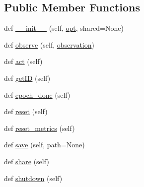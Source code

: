 \subsection*{Public Member Functions}
\begin{DoxyCompactItemize}
\item 
def \hyperlink{classparlai_1_1agents_1_1legacy__agents_1_1seq2seq_1_1seq2seq__v0_1_1Agent_ae84057ceae2e7cf0b5d6248b48596b76}{\+\_\+\+\_\+init\+\_\+\+\_\+} (self, \hyperlink{classparlai_1_1agents_1_1legacy__agents_1_1seq2seq_1_1seq2seq__v0_1_1Agent_ae07383697f7232bb21cbd0a1c6e93389}{opt}, shared=None)
\item 
def \hyperlink{classparlai_1_1agents_1_1legacy__agents_1_1seq2seq_1_1seq2seq__v0_1_1Agent_a39f030b5540055279a41d99dd8b8690c}{observe} (self, \hyperlink{classparlai_1_1agents_1_1legacy__agents_1_1seq2seq_1_1seq2seq__v0_1_1Agent_a6371fe160ef331078a794fc1d8b67371}{observation})
\item 
def \hyperlink{classparlai_1_1agents_1_1legacy__agents_1_1seq2seq_1_1seq2seq__v0_1_1Agent_a403f4e9f07a342da898de6768f857bf3}{act} (self)
\item 
def \hyperlink{classparlai_1_1agents_1_1legacy__agents_1_1seq2seq_1_1seq2seq__v0_1_1Agent_a8bddd5b89230c9a2810e7ca15914997e}{get\+ID} (self)
\item 
def \hyperlink{classparlai_1_1agents_1_1legacy__agents_1_1seq2seq_1_1seq2seq__v0_1_1Agent_a2a9ad9d2de9befe0dca62d19ae0d797c}{epoch\+\_\+done} (self)
\item 
def \hyperlink{classparlai_1_1agents_1_1legacy__agents_1_1seq2seq_1_1seq2seq__v0_1_1Agent_a7151ba0c843bd32a0d9c5376fbf9c803}{reset} (self)
\item 
def \hyperlink{classparlai_1_1agents_1_1legacy__agents_1_1seq2seq_1_1seq2seq__v0_1_1Agent_acbe0accc588c66ea679806cd6450b293}{reset\+\_\+metrics} (self)
\item 
def \hyperlink{classparlai_1_1agents_1_1legacy__agents_1_1seq2seq_1_1seq2seq__v0_1_1Agent_a7bb24c12c27de36cc7ca6a200ffa9aa1}{save} (self, path=None)
\item 
def \hyperlink{classparlai_1_1agents_1_1legacy__agents_1_1seq2seq_1_1seq2seq__v0_1_1Agent_a76e7a147dd6740bd60f696a5f0c34e5a}{share} (self)
\item 
def \hyperlink{classparlai_1_1agents_1_1legacy__agents_1_1seq2seq_1_1seq2seq__v0_1_1Agent_af8eca4b6d832aa2b55ac191324105c43}{shutdown} (self)
\end{DoxyCompactItemize}
